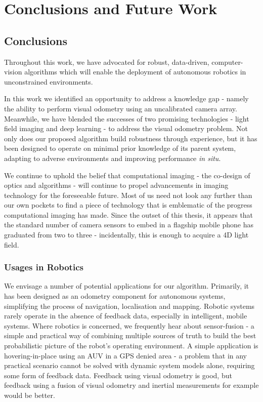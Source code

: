 \chapter{Conclusions and Future Work}


\section{Conclusions}
Throughout this work, we have advocated for robust, data-driven, computer-vision algorithms which will enable the deployment of autonomous robotics in unconstrained environments. 

In this work we identified an opportunity to address a knowledge gap - namely the ability to perform visual odometry using an uncalibrated camera array. Meanwhile, we have blended the successes of two promising technologies - light field imaging and deep learning - to address the visual odometry problem.  Not only does our proposed algorithm build robustness through experience, but it has been designed to operate on minimal prior knowledge of its parent system, adapting to adverse environments and improving performance \textit{in situ}. 

We continue to uphold the belief that computational imaging - the co-design of optics and algorithms - will continue to propel advancements in imaging technology for the foreseeable future. Most of us need not look any further than our own pockets to find a piece of technology that is emblematic of the progress computational imaging has made. Since the outset of this thesis, it appears that the standard number of camera sensors to embed in a flagship mobile phone has graduated from two to three - incidentally, this is enough to acquire a 4D light field.

\subsection{Usages in Robotics}
We envisage a number of potential applications for our algorithm. Primarily, it has been designed as an odometry component for autonomous systems, simplifying the process of navigation, localisation and mapping. Robotic systems rarely operate in the absence of feedback data, especially in intelligent, mobile systems. Where robotics is concerned, we frequently hear about sensor-fusion - a simple and practical way of combining multiple sources of truth to build the best probabilistic picture of the robot's operating environment. A simple application is hovering-in-place using an AUV in a GPS denied area - a problem that in any practical scenario cannot be solved with dynamic system models alone, requiring some form of feedback data. Feedback using visual odometry is good, but feedback using a fusion of visual odometry and inertial measurements for example would be better. 

